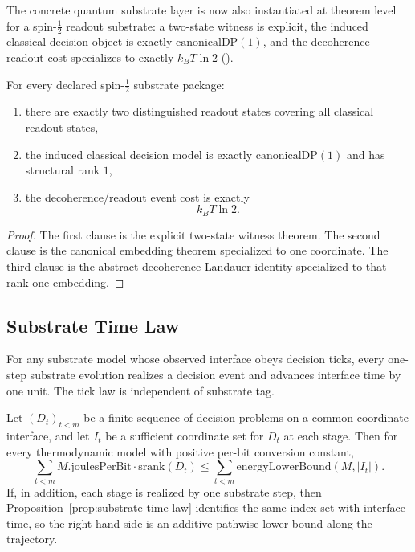 The concrete quantum substrate layer is now also instantiated at theorem level for a spin-$\tfrac12$ readout substrate: a two-state witness is explicit, the induced classical decision object is exactly $\mathrm{canonicalDP}(1)$, and the decoherence readout cost specializes to exactly $k_B T\ln 2$ ().

\begin{theorem}\label{thm:spinhalf-concrete-quantum-instantiation}
For every declared spin-$\tfrac12$ substrate package:
\begin{enumerate}
\item there are exactly two distinguished readout states covering all classical readout states,
\item the induced classical decision model is exactly $\mathrm{canonicalDP}(1)$ and has structural rank $1$,
\item the decoherence/readout event cost is exactly
\[
k_B T\ln 2.
\]
\end{enumerate}
\end{theorem}

\begin{proof}
The first clause is the explicit two-state witness theorem. The second clause is the canonical embedding theorem specialized to one coordinate. The third clause is the abstract decoherence Landauer identity specialized to that rank-one embedding.
\end{proof}

\subsection{Substrate Time Law}

\begin{proposition}\label{prop:substrate-time-law}
For any substrate model whose observed interface obeys decision ticks, every one-step substrate evolution realizes a decision event and advances interface time by one unit. The tick law is independent of substrate tag.
\end{proposition}

\begin{theorem}\label{thm:pathwise-energy-lower-bound}
Let $(D_t)_{t<m}$ be a finite sequence of decision problems on a common coordinate interface, and let $I_t$ be a sufficient coordinate set for $D_t$ at each stage. Then for every thermodynamic model with positive per-bit conversion constant,
\[
\sum_{t<m} M.\mathrm{joulesPerBit}\cdot \mathrm{srank}(D_t)
\le
\sum_{t<m} \mathrm{energyLowerBound}(M,|I_t|).
\]
If, in addition, each stage is realized by one substrate step, then Proposition~\ref{prop:substrate-time-law} identifies the same index set with interface time, so the right-hand side is an additive pathwise lower bound along the trajectory.
\end{theorem}

